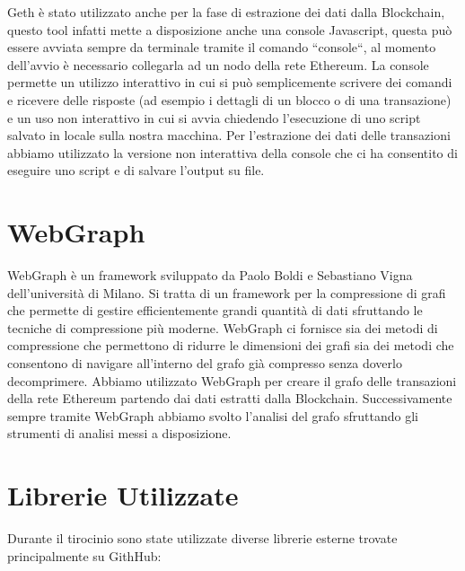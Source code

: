\documentclass[12pt]{report}
\begin{document}
Geth è stato utilizzato anche per la fase di estrazione dei dati dalla Blockchain, questo tool infatti mette a disposizione anche una console Javascript, questa può essere avviata sempre da terminale tramite il comando ``console``, al momento dell'avvio è necessario collegarla ad un nodo della rete Ethereum.
La console permette un utilizzo interattivo in cui si può semplicemente scrivere dei comandi e ricevere delle risposte (ad esempio i dettagli di un blocco o di una transazione) e un uso non interattivo in cui si avvia chiedendo l'esecuzione di uno script salvato in locale sulla nostra macchina.
Per l'estrazione dei dati delle transazioni abbiamo utilizzato la versione non interattiva della console che ci ha consentito di eseguire uno script e di salvare l'output su file.


\section{WebGraph}

WebGraph \cite{WebGraph} è un framework sviluppato da Paolo Boldi e Sebastiano Vigna dell'università di Milano.
Si tratta di un framework per la compressione di grafi che permette di gestire efficientemente grandi quantità di dati sfruttando le tecniche di compressione più moderne.
WebGraph ci fornisce sia dei metodi di compressione che permettono di ridurre le dimensioni dei grafi sia dei metodi che consentono di navigare all'interno del grafo già compresso senza doverlo decomprimere.
Abbiamo utilizzato WebGraph per creare il grafo delle transazioni della rete Ethereum partendo dai dati estratti dalla Blockchain.
Successivamente sempre tramite WebGraph abbiamo svolto l'analisi del grafo sfruttando gli strumenti di analisi messi a disposizione.


\section{Librerie Utilizzate}

Durante il tirocinio sono state utilizzate diverse librerie esterne trovate principalmente su GithHub:
\end{document}
